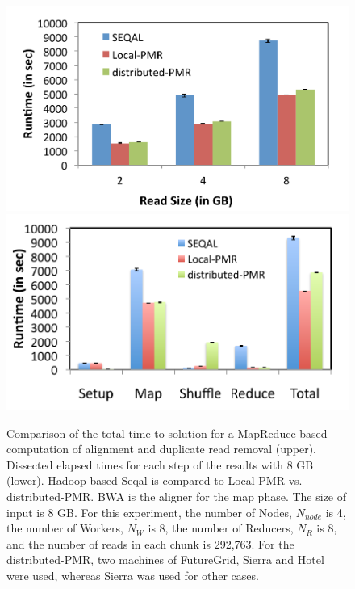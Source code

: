 \documentclass{acm_proc_article-sp}
\begin{document}
\begin{figure}
 \centering
\includegraphics[scale=0.50]{figures/seqalvslocalpmr.pdf}
\includegraphics[scale=0.52]{figures/8GB_phasewisetimes.pdf}

\caption{\small Comparison of the total time-to-solution for a MapReduce-based computation of alignment and duplicate read removal (upper).  Dissected elapsed times for each step of the results with 8 GB (lower). Hadoop-based Seqal is compared to Local-PMR vs. distributed-PMR.  BWA is the aligner for the map phase.  The size of input is 8 GB.  For this experiment, the number of Nodes, $N_{node}$ is 4, the number of Workers, $N_W$ is 8, the number of Reducers, $N_R$ is 8, and the number of reads in each chunk is 292,763. For the distributed-PMR, two machines of FutureGrid, Sierra and Hotel were used, whereas Sierra was used for other cases.}
  \label{fig:comp_with_seqal_1} 
\end{figure}

\end{document}

